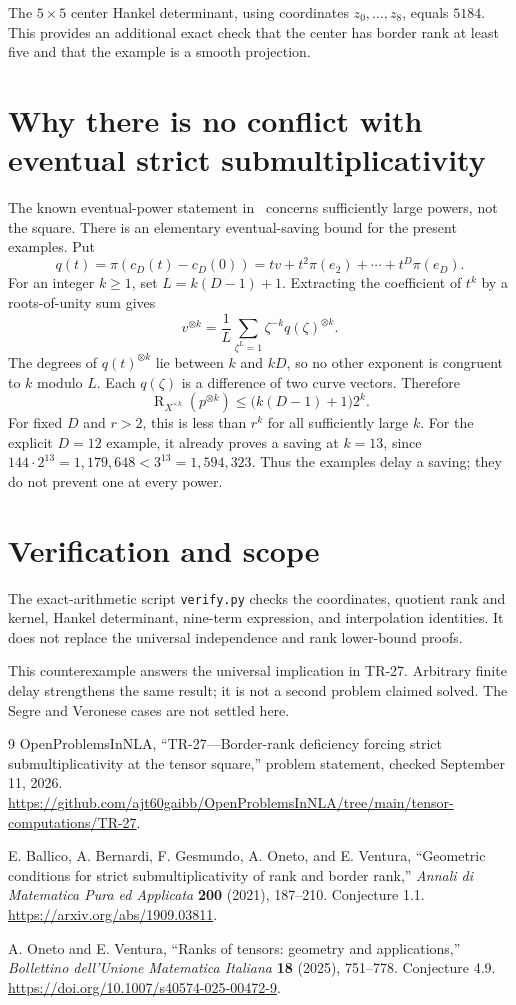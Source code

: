 \documentclass[11pt]{article}
\theoremstyle{remark}\newtheorem{remark}[theorem]{Remark}
\newcommand{\rk}{\operatorname{R}}
\begin{document}
The $5\times5$ center Hankel determinant, using coordinates $z_0,\ldots,z_8$, equals $5184$. This provides an additional exact check that the center has border rank at least five and that the example is a smooth projection.

\section{Why there is no conflict with eventual strict submultiplicativity}
The known eventual-power statement in~\cite[Section 1]{BBGOV} concerns sufficiently large powers, not the square. There is an elementary eventual-saving bound for the present examples. Put
\[
 q(t)=\pi(c_D(t)-c_D(0))=tv+t^2\pi(e_2)+\cdots+t^D\pi(e_D).
\]
For an integer $k\geq1$, set $L=k(D-1)+1$. Extracting the coefficient of $t^k$ by a roots-of-unity sum gives
\[
 v^{\otimes k}=\frac1L\sum_{\zeta^L=1}\zeta^{-k}q(\zeta)^{\otimes k}.
\]
The degrees of $q(t)^{\otimes k}$ lie between $k$ and $kD$, so no other exponent is congruent to $k$ modulo $L$. Each $q(\zeta)$ is a difference of two curve vectors. Therefore
\[
 \rk_{X^{\times k}}(p^{\otimes k})\leq\bigl(k(D-1)+1\bigr)2^k.
\]
For fixed $D$ and $r>2$, this is less than $r^k$ for all sufficiently large $k$. For the explicit $D=12$ example, it already proves a saving at $k=13$, since
$144\cdot2^{13}=1{,}179{,}648<3^{13}=1{,}594{,}323$.
Thus the examples delay a saving; they do not prevent one at every power.

\section{Verification and scope}
The exact-arithmetic script \texttt{verify.py} checks the coordinates, quotient rank and kernel, Hankel determinant, nine-term expression, and interpolation identities. It does not replace the universal independence and rank lower-bound proofs.

This counterexample answers the universal implication in TR-27. Arbitrary finite delay strengthens the same result; it is not a second problem claimed solved. The Segre and Veronese cases are not settled here.

\begin{thebibliography}{9}
OpenProblemsInNLA, ``TR-27---Border-rank deficiency forcing strict submultiplicativity at the tensor square,'' problem statement, checked September 11, 2026.
\url{https://github.com/ajt60gaibb/OpenProblemsInNLA/tree/main/tensor-computations/TR-27}.

E. Ballico, A. Bernardi, F. Gesmundo, A. Oneto, and E. Ventura,
``Geometric conditions for strict submultiplicativity of rank and border rank,''
\emph{Annali di Matematica Pura ed Applicata} \textbf{200} (2021), 187--210.
Conjecture 1.1. \url{https://arxiv.org/abs/1909.03811}.

A. Oneto and E. Ventura, ``Ranks of tensors: geometry and applications,''
\emph{Bollettino dell'Unione Matematica Italiana} \textbf{18} (2025), 751--778.
Conjecture 4.9. \url{https://doi.org/10.1007/s40574-025-00472-9}.
\end{thebibliography}
\end{document}
